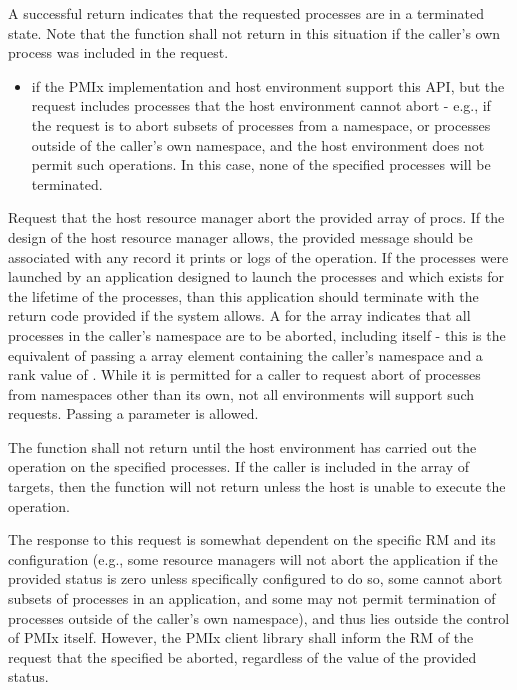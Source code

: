 A successful return indicates that the requested processes are in a terminated state.  Note that the function shall not return in this situation if the caller's own process was included in the request.

\returnstart
\begin{itemize}
    \item {} if the \ac{PMIx} implementation and host environment support this \ac{API}, but the request includes processes that the host environment cannot abort - e.g., if the request is to abort subsets of processes from a namespace, or processes outside of the caller's own namespace, and the host environment does not permit such operations. In this case, none of the specified processes will be terminated.
\end{itemize}
\returnend

\descr
Request that the host resource manager abort the provided array of procs.   If the design of the host resource manager allows, the provided message should be associated with any record it prints or logs of the operation.   
If the processes were launched by an application designed to launch the processes and which exists for the lifetime of the processes, than this application should terminate with the return code provided if the system allows.
A  for the  array indicates that all processes in the caller's namespace are to be aborted, including itself - this is the equivalent of passing a  array element containing the caller's namespace and a rank value of . While it is permitted for a caller to request abort of processes from namespaces other than its own, not all environments will support such requests.
Passing a   parameter is allowed.

The function shall not return until the host environment has carried out the operation on the specified processes. If the caller is included in the array of targets, then the function will not return unless the host is unable to execute the operation.

\adviceuserstart
The response to this request is somewhat dependent on the specific \ac{RM} and its configuration (e.g., some resource managers will not abort the application if the provided status is zero unless specifically configured to do so, some cannot abort subsets of processes in an application, and some may not permit termination of processes outside of the caller's own namespace), and thus lies outside the control of PMIx itself.
However, the PMIx client library shall inform the \ac{RM} of the request that the specified  be aborted, regardless of the value of the provided status.

